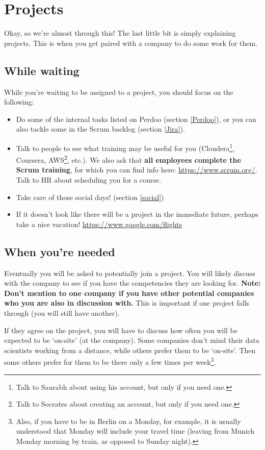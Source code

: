 \documentclass[11pt]{report}
\begin{document}
\section{Projects}
\label{Projects}
Okay, so we're almost through this! The last little bit is simply explaining projects. This is when you get paired with a company to do some work for them.

\subsection{While waiting}
While you're waiting to be assigned to a project, you should focus on the following:
\begin{itemize}
\item Do some of the internal tasks listed on Perdoo (section \ref{Perdoo}), or you can also tackle some in the Scrum backlog (section \ref{Jira}).
\item Talk to people to see what training may be useful for you (Cloudera\footnote{Talk to Saurabh about using his account, but only if you need one.}, Coursera, AWS\footnote{Talk to Socrates about creating an account, but only if you need one.}, etc.). We also ask that \textbf{all employees complete the Scrum training}, for which you can find info here: \href{https://www.scrum.org/}{https://www.scrum.org/}. Talk to HR about scheduling you for a course.
\item Take care of those social days! (section \ref{social})
\item If it doesn't look like there will be a project in the immediate future, perhaps take a nice vacation!
\href{https://www.google.com/flights}{https://www.google.com/flights}
\end{itemize}

\subsection{When you're needed}
\label{when you're needed}
Eventually you will be asked to potentially join a project. You will likely discuss with the company to see if you have the competencies they are looking for. \textbf{Note: Don't mention to one company if you have other potential companies who you are also in discussion with.} This is important if one project falls through (you will still have another).

If they agree on the project, you will have to discuss how often you will be expected to be `on-site' (at the company). Some companies don't mind their data scientists working from a distance, while others prefer them to be `on-site'. Then some others prefer for them to be there only a few times per week\footnote{Also, if you have to be in Berlin on a Monday, for example, it is usually understood that Monday will include your travel time (leaving from Munich Monday morning by train, as opposed to Sunday night).}.
\end{document}
